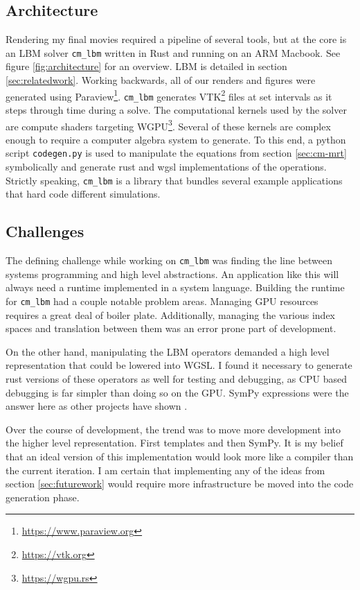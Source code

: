\subsection{Architecture}\label{sec:architecture}

Rendering my final movies required a pipeline of several tools,
but at the core is an LBM solver \lstinline{cm_lbm} written in Rust 
and running on an ARM Macbook.
See figure \ref{fig:architecture} for an overview.
LBM is detailed in section \ref{sec:relatedwork}. 
Working backwards, all of our renders
and figures were generated using 
Paraview\footnote{\url{https://www.paraview.org}}.
\lstinline{cm_lbm} generates 
VTK\footnote{\url{https://vtk.org}} files at set intervals as it 
steps through time during a solve.
The computational kernels used by the solver are 
compute shaders targeting WGPU\footnote{\url{https://wgpu.rs}}.
Several of these kernels are complex enough
to require a computer algebra system to generate.
To this end, a python script \lstinline{codegen.py}
is used to manipulate the equations from section \ref{sec:cm-mrt}
symbolically and generate
rust and wgsl implementations of the operations.
Strictly speaking, \lstinline{cm_lbm} is a library 
that bundles several example applications 
that hard code different simulations.

\subsection{Challenges}
The defining challenge while working on \lstinline{cm_lbm} was finding
the line between systems programming and high level abstractions.
An application like this will always 
need a runtime implemented in a system language.
Building the runtime for \lstinline{cm_lbm} had a couple notable 
problem areas.
Managing GPU resources requires a great deal of boiler plate.
Additionally, managing the various index spaces and translation
between them was an error prone part of development.

On the other hand, manipulating the LBM operators
demanded a high level representation that could be lowered
into WGSL.
I found it necessary to generate rust versions of these
operators as well for testing and debugging, as 
CPU based debugging is far simpler than doing so on the GPU.
SymPy expressions were the answer here as other projects have shown \cite{Hennig2023, web:literate_lbm}.

Over the course of development, the trend was to move
more development into the higher level representation.
First templates and then SymPy.
It is my belief that an ideal version of this implementation would
look more like a compiler than the current iteration.
I am certain that implementing any of the ideas from 
section \ref{sec:futurework}
would require more infrastructure be moved into the 
code generation phase.

